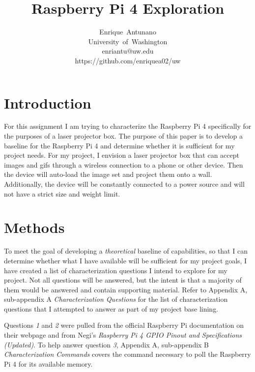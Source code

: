 \documentclass[journal]{IEEEtran}
\begin{document}
    \title{Raspberry Pi 4 Exploration}

    \author{Enrique~Antunano\\University~of~Washington\\enriantu@uw.edu\\https://github.com/enriquea02/uw}


    \maketitle

    \begin{abstract}
    
    \end{abstract}
    \section{Introduction}

    For this assignment I am trying to characterize the Raspberry Pi 4 specifically for the purposes of a laser projector box. 
    The purpose of this paper is to develop a baseline for the Raspberry Pi 4 and determine whether it is sufficient for my project needs.
    For my project, I envision a laser projector box that can accept images and gifs through a wireless connection to a phone or other device. 
    Then the device will auto-load the image set and project them onto a wall. 
    Additionally, the device will be constantly connected to a power source and will not have a strict size and weight limit.

    \section{Methods}
    To meet the goal of developing a \emph{theoretical} baseline of capabilities, so that I can determine whether what I have available will be sufficient for my project goals, 
    I have created a list of characterization questions I intend to explore for my project.
    Not all questions will be answered, but the intent is that a majority of them would be answered and contain supporting material.
    Refer to Appendix A, sub-appendix A \emph{Characterization Questions} for the list of characterization questions that I attempted to answer as part of my project base lining.

    Questions \emph{1} and \emph{2} were pulled from the official Raspberry Pi documentation on their webpage and from Negi's \emph{Raspberry Pi 4 GPIO Pinout and Specifications (Updated)}.
    To help answer question \emph{3}, Appendix A, sub-appendix B \emph{Characterization Commands} covers the command necessary to poll the Raspberry Pi 4 for its available memory.
\end{document}

